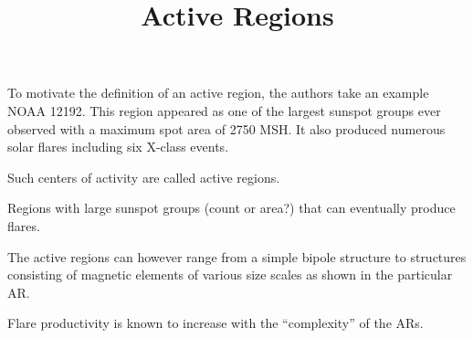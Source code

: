 \documentclass{../template/texnote}
\title{Active Regions}
\begin{document}
    \maketitle {}
	\section{
}

To motivate the definition of an active region, the authors take an example 
NOAA 12192.
This region appeared as one of the largest sunspot groups ever observed with a maximum spot area of 2750 MSH. It also produced numerous solar flares including six X-class events. 

Such centers of activity are called active regions.

Regions with large sunspot groups (count or area?) that can eventually produce flares. 

The active regions can however range from a simple bipole structure to structures consisting of magnetic elements of various size scales as shown in the particular AR.

Flare productivity is known to increase with the “complexity” of the ARs.

    \printbibliography
\end{document}
